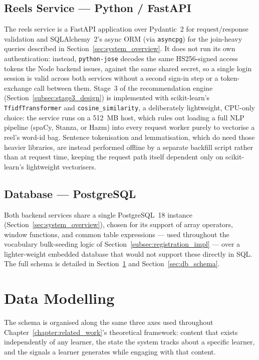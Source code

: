     \subsection{Reels Service --- Python / FastAPI}
    \label{subsec:reels_stack}
    \begin{sloppypar}
    The reels service is a FastAPI application over Pydantic~2 for request/response validation and SQLAlchemy~2's async ORM (via \texttt{asyncpg}) for the join-heavy queries described in Section~\ref{sec:system_overview}. It does not run its own authentication: instead, \texttt{python-jose} decodes the same HS256-signed access tokens the Node backend issues, against the same shared secret, so a single login session is valid across both services without a second sign-in step or a token-exchange call between them. Stage~3 of the recommendation engine (Section~\ref{subsec:stage3_design}) is implemented with scikit-learn's \texttt{TfidfTransformer} and \texttt{cosine\_similarity}, a deliberately lightweight, CPU-only choice: the service runs on a 512~MB host, which rules out loading a full NLP pipeline (spaCy, Stanza, or Hazm) into every request worker purely to vectorise a reel's word-id bag. Sentence tokenisation and lemmatisation, which do need those heavier libraries, are instead performed offline by a separate backfill script rather than at request time, keeping the request path itself dependent only on scikit-learn's lightweight vectorisers.
    \end{sloppypar}

    \subsection{Database --- PostgreSQL}
    \label{subsec:db_stack}
    Both backend services share a single PostgreSQL~18 instance (Section~\ref{sec:system_overview}), chosen for its support of array operators, window functions, and common table expressions --- used throughout the vocabulary bulk-seeding logic of Section~\ref{subsec:registration_impl} --- over a lighter-weight embedded database that would not support these directly in SQL. The full schema is detailed in Section~\ref{sec:data_modelling} and Section~\ref{sec:db_schema}.


\section{Data Modelling} \label{sec:data_modelling}
    The schema is organised along the same three axes used throughout Chapter~\ref{chapter:related_work}'s theoretical framework: content that exists independently of any learner, the state the system tracks about a specific learner, and the signals a learner generates while engaging with that content.

